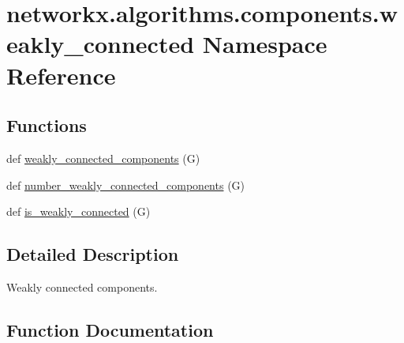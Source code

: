 \hypertarget{namespacenetworkx_1_1algorithms_1_1components_1_1weakly__connected}{}\section{networkx.\+algorithms.\+components.\+weakly\+\_\+connected Namespace Reference}
\label{namespacenetworkx_1_1algorithms_1_1components_1_1weakly__connected}
\subsection*{Functions}
\begin{DoxyCompactItemize}
\item 
def \hyperlink{namespacenetworkx_1_1algorithms_1_1components_1_1weakly__connected_a3ac69a04b73ced987d42f323b00666ee}{weakly\+\_\+connected\+\_\+components} (G)
\item 
def \hyperlink{namespacenetworkx_1_1algorithms_1_1components_1_1weakly__connected_a3594af7b5d81172279c1e0d628bd15b5}{number\+\_\+weakly\+\_\+connected\+\_\+components} (G)
\item 
def \hyperlink{namespacenetworkx_1_1algorithms_1_1components_1_1weakly__connected_ad511e0c266743521ab669cb959947ef0}{is\+\_\+weakly\+\_\+connected} (G)
\end{DoxyCompactItemize}


\subsection{Detailed Description}
\begin{DoxyVerb}Weakly connected components.\end{DoxyVerb}
 

\subsection{Function Documentation}
\mbox{\label{namespacenetworkx_1_1algorithms_1_1components_1_1weakly__connected_ad511e0c266743521ab669cb959947ef0}} 
